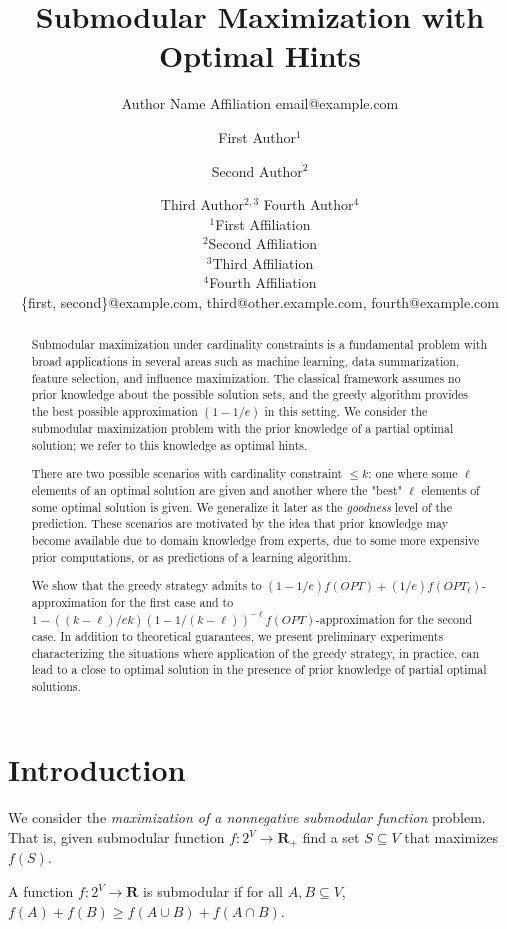 \documentclass{article}
\title{Submodular Maximization with Optimal Hints}
\author{
    Author Name
    \affiliations
    Affiliation
    \emails
    email@example.com
}
\author{
First Author$^1$
\and
Second Author$^2$\and
Third Author$^{2,3}$\And
Fourth Author$^4$\\
\affiliations
$^1$First Affiliation\\
$^2$Second Affiliation\\
$^3$Third Affiliation\\
$^4$Fourth Affiliation\\
\emails
\{first, second\}@example.com,
third@other.example.com,
fourth@example.com
}
\begin{document}
\maketitle

\begin{abstract}
    Submodular maximization under cardinality constraints is a fundamental problem with broad applications in several areas such as machine learning, data summarization, feature selection, and influence maximization. The classical framework assumes no prior knowledge about the possible solution sets, and the greedy algorithm provides the best possible approximation $(1-1/e)$ in this setting. We consider the submodular maximization problem with the prior knowledge of a partial optimal solution; we refer to this knowledge as optimal hints.  

There are two possible scenarios with cardinality constraint $\leq k$: 
one where some $\ell$ elements of an optimal solution are given and another where  the "best" $\ell$ elements of some optimal solution is given. We generalize it later as the \emph{goodness} level of the prediction. These scenarios are motivated by the idea that prior knowledge may become available due to domain knowledge from experts,  due to some more expensive prior computations, or as predictions of a learning algorithm. 

We show that the greedy strategy admits to 
$(1-1/e)f(OPT) + (1/e) f(OPT_{\ell})$-approximation for the first case and to $1 - ((k-\ell)/ek) (1 - 1/(k-\ell))^{-\ell}f(OPT)$-approximation for the second case. In addition to theoretical guarantees, we present preliminary experiments characterizing the situations where application of the greedy strategy, in practice, can lead to a close to optimal solution  in the presence of prior knowledge of partial optimal solutions. 
\end{abstract}

\section{Introduction}

We consider the \emph{maximization of a nonnegative submodular function} problem. That is, given submodular function $f: 2^{V} \rightarrow \mathbf{R}_+$ find a set $S \subseteq V$ that maximizes $f(S)$. 

A function $f: 2^{V} \rightarrow \mathbf{R}$ is submodular if for all $A, B \subseteq V$, $f(A) + f(B) \geq  f(A \cup B) + f(A \cap B)$. 
\end{document}
